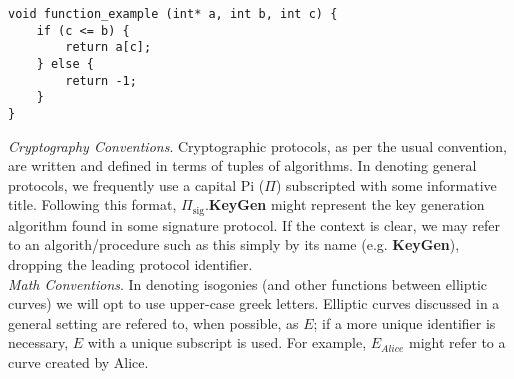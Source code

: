 \label{code:pbinv}
\begin{lstlisting}
void function_example (int* a, int b, int c) {
	if (c <= b) {
		return a[c];
	} else {
		return -1;
	}
}
\end{lstlisting}

\noindent
\textit{Cryptography Conventions}. Cryptographic protocols, as per the usual convention, are written and defined in terms of tuples of algorithms. In denoting general protocols, we frequently use a capital Pi ($\Pi$) subscripted with some informative title. Following this format, $\Pi_{\text{sig}}$.\textbf{KeyGen} might represent the key generation algorithm found in some signature protocol. If the context is clear, we may refer to an algorith/procedure such as this simply by its name (e.g. \textbf{KeyGen}), dropping the leading protocol identifier.\\

\noindent
\textit{Math Conventions}. In denoting isogonies (and other functions between elliptic curves) we will opt to use upper-case greek letters. Elliptic curves discussed in a general setting are refered to, when possible, as $E$; if a more unique identifier is necessary, $E$ with a unique subscript is used. For example, $E_{Alice}$ might refer to a curve created by Alice.  


